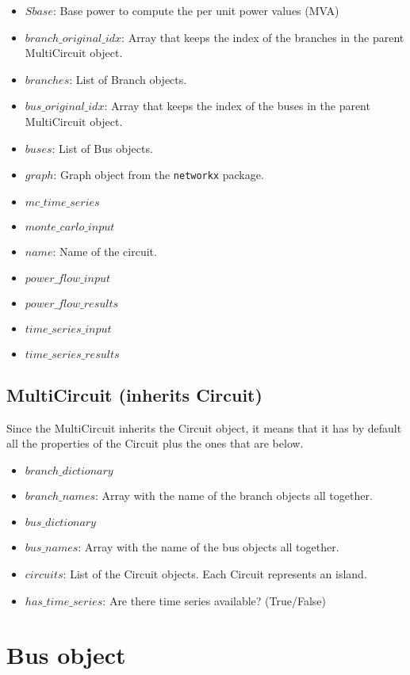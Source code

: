 \documentclass[11pt,fleqn]{book} %
\begin{document}
\begin{itemize}
	\item $Sbase$: Base power to compute the per unit power values (MVA)
	\item $branch\_original\_idx$: Array that keeps the index of the branches in the parent MultiCircuit object.
	\item $branches$: List of Branch objects.
	\item $bus\_original\_idx$: Array that keeps the index of the buses in the parent MultiCircuit object.
	\item $buses$: List of Bus objects.
	\item $graph$: Graph object from the \verb|networkx| package.
	\item $mc\_time\_series$
	\item $monte\_carlo\_input$
	\item $name$: Name of the circuit.
	\item $power\_flow\_input$
	\item $power\_flow\_results$
	\item $time\_series\_input$
	\item $time\_series\_results$
\end{itemize}


\subsection{MultiCircuit (inherits Circuit)}

Since the MultiCircuit inherits the Circuit object, it means that it has by default all the properties of the Circuit plus the ones that are below.

\begin{itemize}
	\item $branch\_dictionary$
	\item $branch\_names$: Array with the name of the branch objects all together.
	\item $bus\_dictionary$
	\item $bus\_names$: Array with the name of the bus objects all together.
	\item $circuits$: List of the Circuit objects. Each Circuit represents an island.
	\item $has\_time\_series$: Are there time series available? (True/False)
\end{itemize}


\section{Bus object}
\end{document}

